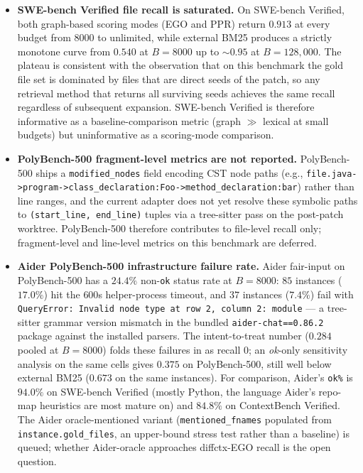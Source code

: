 \documentclass[11pt, a4paper]{article}
\begin{document}
\begin{itemize}
    \item \textbf{SWE-bench Verified file recall is saturated.} On SWE-bench Verified, both graph-based scoring modes (EGO and PPR) return $0.913$ at every budget from $8000$ to unlimited, while external BM25 produces a strictly monotone curve from $0.540$ at $B{=}8000$ up to $\sim 0.95$ at $B{=}128{,}000$. The plateau is consistent with the observation that on this benchmark the gold file set is dominated by files that are direct seeds of the patch, so any retrieval method that returns all surviving seeds achieves the same recall regardless of subsequent expansion. SWE-bench Verified is therefore informative as a baseline-comparison metric (graph $\gg$ lexical at small budgets) but uninformative as a scoring-mode comparison.
    \item \textbf{PolyBench-500 fragment-level metrics are not reported.} PolyBench-500 ships a \texttt{modified\_nodes} field encoding CST node paths (e.g., \texttt{file.java->program->class\_declaration:Foo->method\_declaration:bar}) rather than line ranges, and the current adapter does not yet resolve these symbolic paths to \texttt{(start\_line, end\_line)} tuples via a tree-sitter pass on the post-patch worktree. PolyBench-500 therefore contributes to file-level recall only; fragment-level and line-level metrics on this benchmark are deferred.
    \item \textbf{Aider PolyBench-500 infrastructure failure rate.} Aider fair-input on PolyBench-500 has a $24.4\%$ non-\texttt{ok} status rate at $B{=}8000$: $85$ instances ($17.0\%$) hit the $600$s helper-process timeout, and $37$ instances ($7.4\%$) fail with \texttt{QueryError: Invalid node type at row 2, column 2: module} — a tree-sitter grammar version mismatch in the bundled \texttt{aider-chat==0.86.2} package against the installed parsers. The intent-to-treat number ($0.284$ pooled at $B{=}8000$) folds these failures in as recall $0$; an \emph{ok}-only sensitivity analysis on the same cells gives $0.375$ on PolyBench-500, still well below external BM25 ($0.673$ on the same instances). For comparison, Aider's \texttt{ok\%} is $94.0\%$ on SWE-bench Verified (mostly Python, the language Aider's repo-map heuristics are most mature on) and $84.8\%$ on ContextBench Verified. The Aider oracle-mentioned variant (\texttt{mentioned\_fnames} populated from \texttt{instance.gold\_files}, an upper-bound stress test rather than a baseline) is queued; whether Aider-oracle approaches diffctx-EGO recall is the open question.

\end{itemize}
\end{document}
